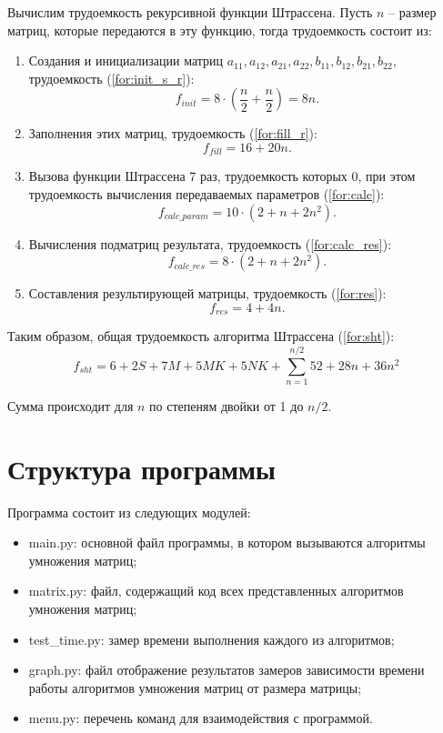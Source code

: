 Вычислим трудоемкость рекурсивной функции Штрассена. Пусть $n$ -- размер матриц, которые передаются в эту функцию, тогда трудоемкость состоит из:
\newpage
\begin{enumerate}
	\item Создания и инициализации матриц $a_{11}, a_{12}, a_{21}, a_{22}, b_{11}, b_{12}, b_{21}, b_{22}$, трудоемкость (\ref{for:init_s_r}):
	\begin{equation}
		\label{for:init_s_r}
		f_{init} = 8 \cdot (\frac{n}{2} + \frac{n}{2}) = 8n.
	\end{equation}
	\item Заполнения этих матриц, трудоемкость (\ref{for:fill_r}):
	\begin{equation}
		\label{for:fill_r}
		f_{fill} = 16 + 20n.
	\end{equation}
	\item Вызова функции Штрассена 7 раз, трудоемкость которых 0, при этом трудоемкость вычисления передаваемых параметров (\ref{for:calc}):
	\begin{equation}
		\label{for:calc}
		f_{calc\_param} = 10 \cdot (2 + n + 2n^2).
	\end{equation}
	\item Вычисления подматриц результата, трудоемкость (\ref{for:calc_res}):
	\begin{equation}
		\label{for:calc_res}
		f_{calc\_res} = 8 \cdot (2 + n + 2n^2).
	\end{equation}
	\item Составления результирующей матрицы, трудоемкость (\ref{for:res}):
	\begin{equation}
		\label{for:res}
		f_{res} = 4 + 4n.
	\end{equation}
\end{enumerate}

Таким образом, общая трудоемкость алгоритма Штрассена (\ref{for:sht}):
\begin{equation}
	\label{for:sht}
	f_{sht} = 6 + 2S + 7M + 5MK + 5NK + \limits\sum_{n=1}^{n/2}{52 + 28n + 36n^2}
\end{equation}

Сумма происходит для $n$ по степеням двойки от 1 до $n/2$.


\section{Структура программы}
Программа состоит из следующих модулей:
\begin{itemize}
	\item main.py: основной файл программы, в котором вызываются алгоритмы умножения матриц;
	\item matrix.py: файл, содержащий код всех представленных алгоритмов умножения матриц;
	\item test\_time.py: замер времени выполнения каждого из алгоритмов;
	\item graph.py: файл отображение результатов замеров зависимости времени работы алгоритмов умножения матриц от размера матрицы;
	\item menu.py: перечень команд для взаимодействия с программой.
\end{itemize}

